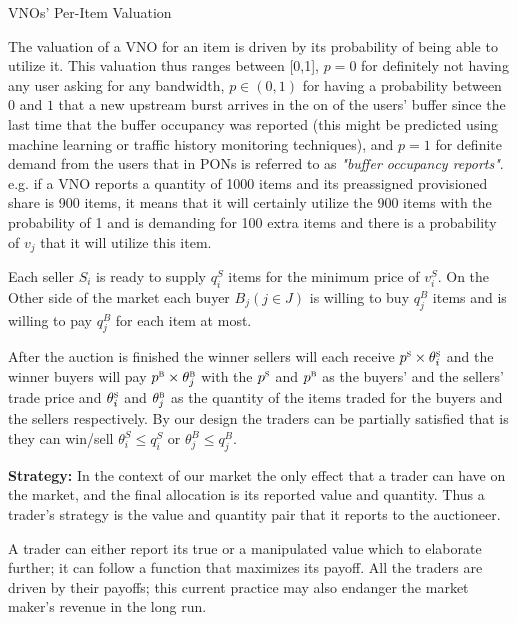 \begin{Definition}
VNOs' Per-Item Valuation
\end{Definition}
The valuation of a \ac{VNO} for an item is driven by its probability of being able to utilize it. This valuation thus ranges between [0,1], $p=0$ for definitely not having any user asking for any bandwidth, $p \in (0,1)$ for having a probability between $0$ and $1$ that a new upstream burst arrives in the on of the users' buffer since the last time that the buffer occupancy was reported (this might be predicted using machine learning or traffic history monitoring techniques), and $p=1$ for definite demand from the users that in \acp{PON} is referred to as \textit{"buffer occupancy reports"}. e.g. if a \ac{VNO} reports a quantity of 1000 items and its preassigned provisioned share is 900 items, it means that it will certainly utilize the 900 items with the probability of 1 and is demanding for 100 extra items and there is a probability of $v_j$ that it will utilize this item.

Each seller $S_{i}$ is ready to supply $q^S_{i}$ items for the minimum price of ${v^S_{i}}$. On the Other side of the market each buyer $B_{j} (j \in J)$ is willing to buy $q^B_{j}$ items and is willing to pay $q^B_{j}$ for each item at most.

After the auction is finished the winner sellers will each receive $p^{\textsc{s}} \times \theta_{i}^\textsc{s}$ and the winner buyers will pay $p^{\textsc{b}} \times \theta_{j}^\textsc{b}$ with the $p^{\textsc{s}}$ and $p^{\textsc{b}}$ as the buyers' and the sellers' trade price and $\theta_{i}^\textsc{s}$ and $\theta_{j}^\textsc{b}$ as the quantity of the items traded for the buyers and the sellers respectively. By our design the traders can be partially satisfied that is they can win/sell $\theta_i^S \leq q_i^S$ or $\theta_j^B \leq q_j^B$.

\begin{Definition}
\label{def_strategy}
\textbf{Strategy:} In the context of our market the only effect that a trader can have on the market, and the final allocation is its reported value and quantity. Thus a trader's strategy is the value and quantity pair that it reports to the auctioneer.
\end{Definition}
A trader can either report its true or a manipulated value which to elaborate further; it can follow a function that maximizes its payoff. All the traders are driven by their payoffs; this current practice may also endanger the market maker's revenue in the long run.

